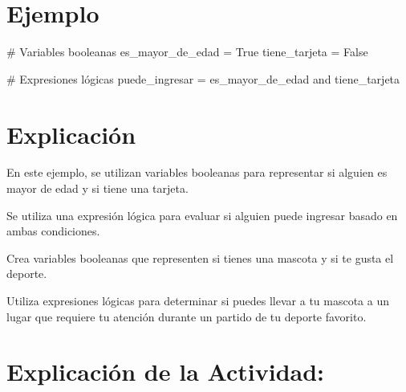 \documentclass[
  a4paper,
  onepage,
  openany]{scrreprt}
\newenvironment{Shaded}{\begin{snugshade}}{\end{snugshade}}
\newcommand{\CommentTok}[1]{\textcolor[rgb]{0.37,0.37,0.37}{#1}}
\newcommand{\KeywordTok}[1]{\textcolor[rgb]{0.00,0.23,0.31}{#1}}
\newcommand{\NormalTok}[1]{\textcolor[rgb]{0.00,0.23,0.31}{#1}}
\newcommand{\OperatorTok}[1]{\textcolor[rgb]{0.37,0.37,0.37}{#1}}
\newcommand{\VariableTok}[1]{\textcolor[rgb]{0.07,0.07,0.07}{#1}}
\begin{document}
\hypertarget{ejemplo-27}{%
\section{Ejemplo}\label{ejemplo-27}}

\begin{Shaded}
\begin{Highlighting}[]
\CommentTok{\# Variables booleanas}
\NormalTok{es\_mayor\_de\_edad }\OperatorTok{=} \VariableTok{True}
\NormalTok{tiene\_tarjeta }\OperatorTok{=} \VariableTok{False}

\CommentTok{\# Expresiones lógicas}
\NormalTok{puede\_ingresar }\OperatorTok{=}\NormalTok{ es\_mayor\_de\_edad }\KeywordTok{and}\NormalTok{ tiene\_tarjeta}
\end{Highlighting}
\end{Shaded}

\hypertarget{explicaciuxf3n-27}{%
\section{Explicación}\label{explicaciuxf3n-27}}

En este ejemplo, se utilizan variables booleanas para representar si
alguien es mayor de edad y si tiene una tarjeta.

Se utiliza una expresión lógica para evaluar si alguien puede ingresar
basado en ambas condiciones.

\begin{tcolorbox}[enhanced jigsaw, breakable, opacityback=0, toptitle=1mm, coltitle=black, toprule=.15mm, rightrule=.15mm, colframe=quarto-callout-important-color-frame, opacitybacktitle=0.6, arc=.35mm, title=\textcolor{quarto-callout-important-color}{\faExclamation}\hspace{0.5em}{Actividad Práctica:}, titlerule=0mm, colbacktitle=quarto-callout-important-color!10!white, bottomtitle=1mm, bottomrule=.15mm, colback=white, left=2mm, leftrule=.75mm]

Crea variables booleanas que representen si tienes una mascota y si te
gusta el deporte.

Utiliza expresiones lógicas para determinar si puedes llevar a tu
mascota a un lugar que requiere tu atención durante un partido de tu
deporte favorito.

\end{tcolorbox}

\hypertarget{explicaciuxf3n-de-la-actividad-25}{%
\section{Explicación de la
Actividad:}\label{explicaciuxf3n-de-la-actividad-25}}
\end{document}
